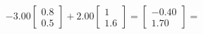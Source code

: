 \documentclass[preview]{standalone}
\begin{document}
\begin{align*}
-3.00 \begin{bmatrix} 0.8 \\ 0.5 \end{bmatrix} + 2.00 \begin{bmatrix} 1 \\ 1.6 \end{bmatrix} = \begin{bmatrix} -0.40 \\ 1.70 \end{bmatrix} =
\end{align*}
\end{document}
